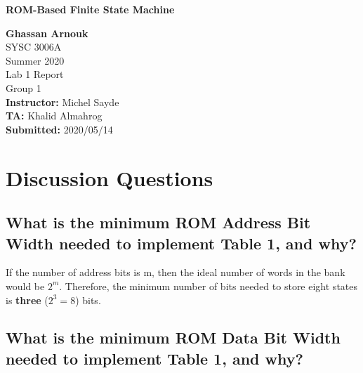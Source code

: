 \documentclass{article}
\begin{document}
	\begin{titlepage}
		\begin{center}
			\vspace{1cm}
			{\LARGE\textbf{ROM-Based Finite State Machine}}

			\vspace{1.5cm}
			\textbf{\large Ghassan Arnouk}\\
			
			\vspace{1cm}
			\large SYSC 3006A\\
			\large Summer 2020\\
			\large Lab 1 Report\\
			\large Group 1\\
			
						
			\vspace{2cm}
			\textbf{Instructor:} Michel Sayde\\
			
			\vspace{0.1cm}
			\textbf{TA:} Khalid Almahrog\\
			
			\vspace{0.1cm}
			\textbf{Submitted:} 2020/05/14\\			
		\end{center}
	\end{titlepage}
	
	\pagebreak
	
	\section{Discussion Questions}

		\subsection{What is the minimum ROM Address Bit Width needed to implement Table 1, and why?}
		
		If the number of address bits is m, then the ideal number of words in the bank would be $2^m$. Therefore, the minimum number of bits needed to store eight states is \textbf{three} ($2^3 = 8$) bits. 
		
		\subsection{What is the minimum ROM Data Bit Width needed to implement Table 1, and why?} 
		
\end{document}
